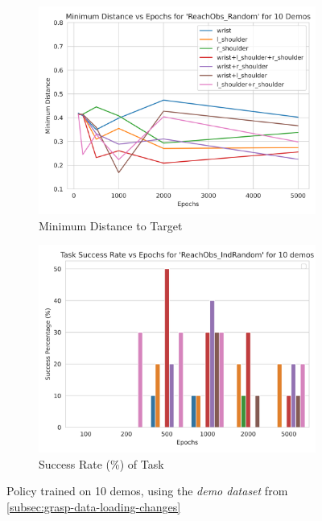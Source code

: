 \begin{figure}[htpb] %
  \centering
  \begin{subfigure}{0.45\linewidth}
    \centering
    \includegraphics[width=\linewidth]{assets/cam-comb/reach-obs/ro_indrandom-obs-mindist-10demos.png}
    \caption{Minimum Distance to Target}\label{subfig:ro-indrandom-demo-mindist-10}
  \end{subfigure}
  \begin{subfigure}{0.45\linewidth}
    \centering
    \includegraphics[width=\linewidth]{assets/cam-comb/reach-obs/ro_indrandom-demo-success-10demos.png}
    \caption{Success Rate (\%) of Task}\label{subfig:ro-indrandom-demo-success-10}
  \end{subfigure}
  \caption{Policy trained on 10 demos, using the \emph{demo dataset} from \ref{subsec:grasp-data-loading-changes}}\label{fig:ro-indrandom-demo-cams}
\end{figure}

